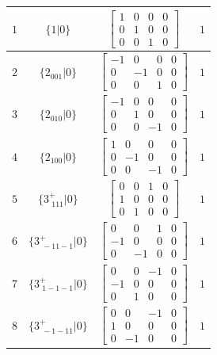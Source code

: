 \documentclass[fleqn,8pt]{jsarticle}
\begin{document}
\begin{longtable}{cccc}
$ 1 $ & $ \{1|0\} $ & $ \begin{bmatrix} 1 & 0 & 0 & 0 \\ 0 & 1 & 0 & 0 \\ 0 & 0 & 1 & 0 \end{bmatrix} $ & $ 1 $ \\ \hline
$ 2 $ & $ \{2{}_{001}|0\} $ & $ \begin{bmatrix} -1 & 0 & 0 & 0 \\ 0 & -1 & 0 & 0 \\ 0 & 0 & 1 & 0 \end{bmatrix} $ & $ 1 $ \\ \hline
$ 3 $ & $ \{2{}_{010}|0\} $ & $ \begin{bmatrix} -1 & 0 & 0 & 0 \\ 0 & 1 & 0 & 0 \\ 0 & 0 & -1 & 0 \end{bmatrix} $ & $ 1 $ \\ \hline
$ 4 $ & $ \{2{}_{100}|0\} $ & $ \begin{bmatrix} 1 & 0 & 0 & 0 \\ 0 & -1 & 0 & 0 \\ 0 & 0 & -1 & 0 \end{bmatrix} $ & $ 1 $ \\ \hline
$ 5 $ & $ \{3^{+}_{\,\,111}|0\} $ & $ \begin{bmatrix} 0 & 0 & 1 & 0 \\ 1 & 0 & 0 & 0 \\ 0 & 1 & 0 & 0 \end{bmatrix} $ & $ 1 $ \\ \hline
$ 6 $ & $ \{3^{+}_{\,\,-11-1}|0\} $ & $ \begin{bmatrix} 0 & 0 & 1 & 0 \\ -1 & 0 & 0 & 0 \\ 0 & -1 & 0 & 0 \end{bmatrix} $ & $ 1 $ \\ \hline
$ 7 $ & $ \{3^{+}_{\,\,1-1-1}|0\} $ & $ \begin{bmatrix} 0 & 0 & -1 & 0 \\ -1 & 0 & 0 & 0 \\ 0 & 1 & 0 & 0 \end{bmatrix} $ & $ 1 $ \\ \hline
$ 8 $ & $ \{3^{+}_{\,\,-1-11}|0\} $ & $ \begin{bmatrix} 0 & 0 & -1 & 0 \\ 1 & 0 & 0 & 0 \\ 0 & -1 & 0 & 0 \end{bmatrix} $ & $ 1 $ \\ \hline

\end{longtable}
\end{document}
